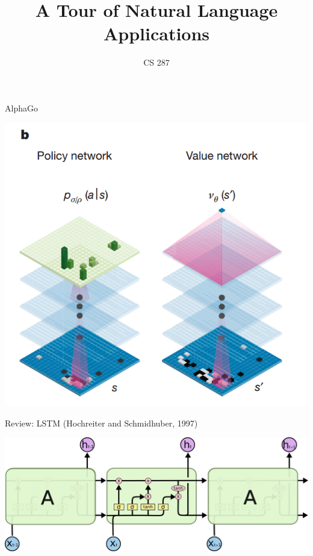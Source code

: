 \documentclass{beamer}
\title{A Tour of Natural Language Applications}
\date{}
\author{CS 287 }
\begin{document}
\begin{frame}
  \titlepage
\end{frame}

\begin{frame}{AlphaGo}
  \begin{center}
    \includegraphics[height=0.7\textheight]{alphago}
  \end{center}
\end{frame}

\begin{frame}{Review: LSTM (Hochreiter and Schmidhuber, 1997)}
  \begin{center}
    \includegraphics[width=\textwidth]{LSTM3-chain}
  \end{center}
\end{frame}
\end{document}
